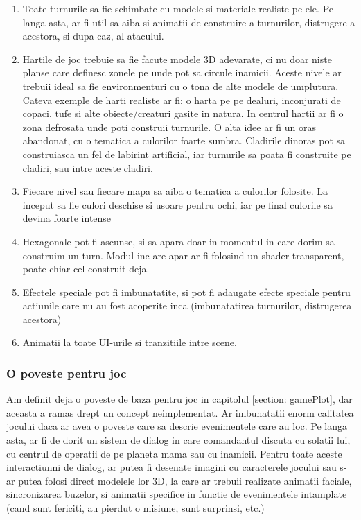 \documentclass[12pt, a4paper]{article}
\begin{document}
	\begin{enumerate}
		\item Toate turnurile sa fie schimbate cu modele si materiale realiste pe ele. Pe langa asta, ar fi util sa aiba si animatii de construire a turnurilor, distrugere a acestora, si dupa caz, al atacului.
		\item Hartile de joc trebuie sa fie facute modele 3D adevarate, ci nu doar niste planse care definesc zonele pe unde pot sa circule inamicii. Aceste nivele ar trebuii ideal sa fie environmenturi cu o tona de alte modele de umplutura. Cateva exemple de harti realiste ar fi: o harta pe pe dealuri, inconjurati de copaci, tufe si alte obiecte/creaturi gasite in natura. In centrul hartii ar fi o zona defrosata unde poti construii turnurile. O alta idee ar fi un oras abandonat, cu o tematica a culorilor foarte sumbra. Cladirile dinoras pot sa construiasca un fel de labirint artificial, iar turnurile sa poata fi construite pe cladiri, sau intre aceste cladiri.
		\item Fiecare nivel sau fiecare mapa sa aiba o tematica a culorilor folosite. La inceput sa fie culori deschise si usoare pentru ochi, iar pe final culorile sa devina foarte intense
		\item Hexagonale pot fi ascunse, si sa apara doar in momentul in care dorim sa construim un turn. Modul inc are apar ar fi folosind un shader transparent, poate chiar cel construit deja.
		\item Efectele speciale pot fi imbunatatite, si pot fi adaugate efecte speciale pentru actiunile care nu au fost acoperite inca (imbunatatirea turnurilor, distrugerea acestora)
		\item Animatii la toate UI-urile si tranzitiile intre scene.
	\end{enumerate}
	
	
	
	
	
	\subsubsection{O poveste pentru joc}
	
	Am definit deja o poveste de baza pentru joc in capitolul \ref{section: gamePlot}, dar aceasta a ramas drept un concept neimplementat. Ar imbunatatii enorm calitatea jocului daca ar avea o poveste care sa descrie evenimentele care au loc. Pe langa asta, ar fi de dorit un sistem de dialog in care comandantul discuta cu solatii lui, cu centrul de operatii de pe planeta mama sau cu inamicii. Pentru toate aceste interactiunni de dialog, ar putea fi desenate imagini cu caracterele jocului sau s-ar putea folosi direct modelele lor 3D, la care ar trebuii realizate animatii faciale, sincronizarea buzelor, si animatii specifice in functie de evenimentele intamplate (cand sunt fericiti, au pierdut o misiune, sunt surprinsi, etc.)
	
\end{document}
